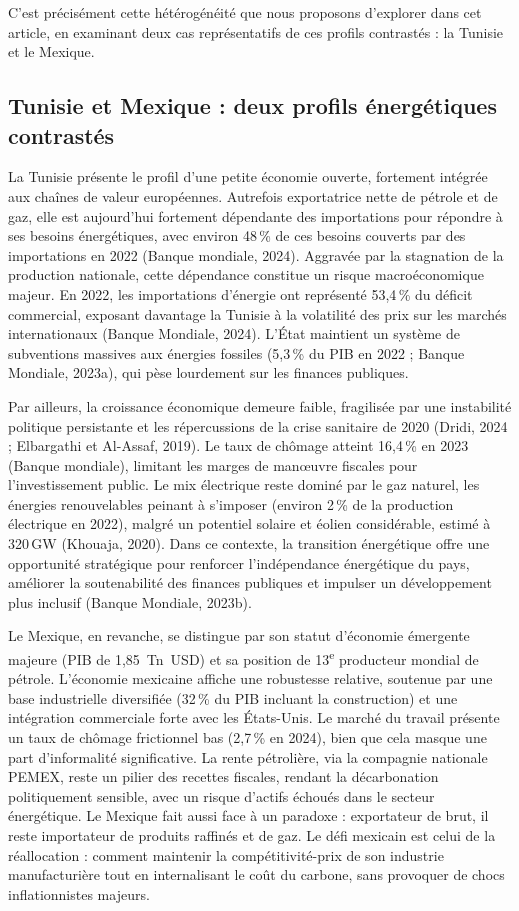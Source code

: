\documentclass[12pt, a4paper]{article}
\begin{document}
C'est précisément cette hétérogénéité que nous proposons d'explorer dans cet article, en examinant deux cas représentatifs de ces profils contrastés : la Tunisie et le Mexique.

\subsection{Tunisie et Mexique : deux profils énergétiques contrastés}

La Tunisie présente le profil d'une petite économie ouverte, fortement intégrée aux chaînes de valeur européennes. Autrefois exportatrice nette de pétrole et de gaz, elle est aujourd'hui fortement dépendante des importations pour répondre à ses besoins énergétiques, avec environ 48\,\% de ces besoins couverts par des importations en 2022 (Banque mondiale, 2024). Aggravée par la stagnation de la production nationale, cette dépendance constitue un risque macroéconomique majeur. En 2022, les importations d'énergie ont représenté 53,4\,\% du déficit commercial, exposant davantage la Tunisie à la volatilité des prix sur les marchés internationaux (Banque Mondiale, 2024). L'État maintient un système de subventions massives aux énergies fossiles (5,3\,\% du PIB en 2022 ; Banque Mondiale, 2023a), qui pèse lourdement sur les finances publiques.

Par ailleurs, la croissance économique demeure faible, fragilisée par une instabilité politique persistante et les répercussions de la crise sanitaire de 2020 (Dridi, 2024 ; Elbargathi et Al-Assaf, 2019). Le taux de chômage atteint 16,4\,\% en 2023 (Banque mondiale), limitant les marges de man\oe{}uvre fiscales pour l'investissement public. Le mix électrique reste dominé par le gaz naturel, les énergies renouvelables peinant à s'imposer (environ 2\,\% de la production électrique en 2022), malgré un potentiel solaire et éolien considérable, estimé à 320\,GW (Khouaja, 2020). Dans ce contexte, la transition énergétique offre une opportunité stratégique pour renforcer l'indépendance énergétique du pays, améliorer la soutenabilité des finances publiques et impulser un développement plus inclusif (Banque Mondiale, 2023b).

Le Mexique, en revanche, se distingue par son statut d'économie émergente majeure (PIB de 1,85~Tn~USD) et sa position de 13\textsuperscript{e} producteur mondial de pétrole. L'économie mexicaine affiche une robustesse relative, soutenue par une base industrielle diversifiée (32\,\% du PIB incluant la construction) et une intégration commerciale forte avec les États-Unis. Le marché du travail présente un taux de chômage frictionnel bas (2,7\,\% en 2024), bien que cela masque une part d'informalité significative. La rente pétrolière, via la compagnie nationale PEMEX, reste un pilier des recettes fiscales, rendant la décarbonation politiquement sensible, avec un risque d'actifs échoués dans le secteur énergétique. Le Mexique fait aussi face à un paradoxe : exportateur de brut, il reste importateur de produits raffinés et de gaz. Le défi mexicain est celui de la réallocation : comment maintenir la compétitivité-prix de son industrie manufacturière tout en internalisant le coût du carbone, sans provoquer de chocs inflationnistes majeurs.
\end{document}
